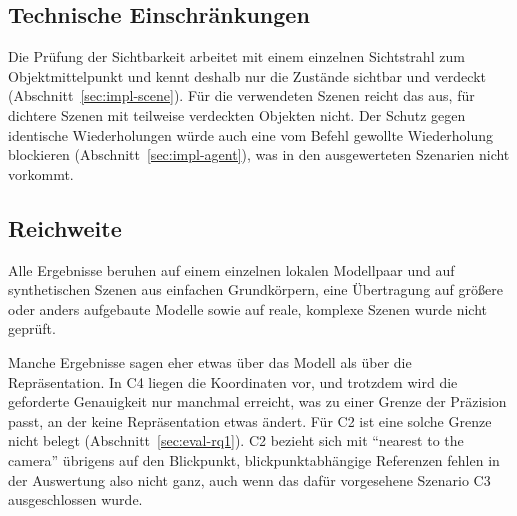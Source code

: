 \subsection*{Technische Einschränkungen}

Die Prüfung der Sichtbarkeit arbeitet mit einem einzelnen Sichtstrahl zum Objektmittelpunkt und kennt deshalb nur die Zustände sichtbar und verdeckt (Abschnitt~\ref{sec:impl-scene}).
Für die verwendeten Szenen reicht das aus, für dichtere Szenen mit teilweise verdeckten Objekten nicht.
Der Schutz gegen identische Wiederholungen würde auch eine vom Befehl gewollte Wiederholung blockieren (Abschnitt~\ref{sec:impl-agent}), was in den ausgewerteten Szenarien nicht vorkommt.

\subsection*{Reichweite}

Alle Ergebnisse beruhen auf einem einzelnen lokalen Modellpaar und auf synthetischen Szenen aus einfachen Grundkörpern, eine Übertragung auf größere oder anders aufgebaute Modelle sowie auf reale, komplexe Szenen wurde nicht geprüft.

Manche Ergebnisse sagen eher etwas über das Modell als über die Repräsentation.
In C4 liegen die Koordinaten vor, und trotzdem wird die geforderte Genauigkeit nur manchmal erreicht, was zu einer Grenze der Präzision passt, an der keine Repräsentation etwas ändert.
Für C2 ist eine solche Grenze nicht belegt (Abschnitt~\ref{sec:eval-rq1}).
C2 bezieht sich mit \enquote{nearest to the camera} übrigens auf den Blickpunkt, blickpunktabhängige Referenzen fehlen in der Auswertung also nicht ganz, auch wenn das dafür vorgesehene Szenario C3 ausgeschlossen wurde.
